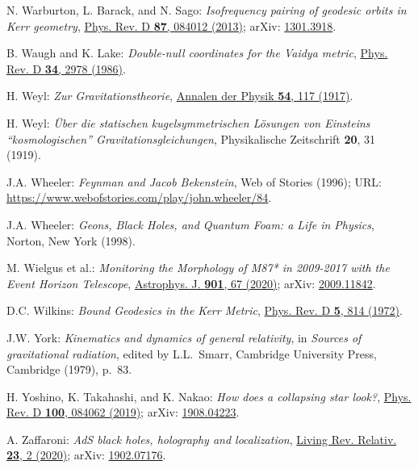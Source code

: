 \begin{thebibliography}{123}
N. Warburton, L. Barack, and N. Sago:
{\em Isofrequency pairing of geodesic orbits in Kerr geometry},
\href{https://doi.org/10.1103/PhysRevD.87.084012}{Phys. Rev. D {\bf 87}, 084012 (2013)};
arXiv: \href{https://arxiv.org/abs/1301.3918}{1301.3918}.

B. Waugh and K. Lake:
{\em Double-null coordinates for the Vaidya metric},
\href{https://doi.org/10.1103/PhysRevD.34.2978}{Phys. Rev. D {\bf 34}, 2978 (1986)}.

H. Weyl:
{\em Zur Gravitationstheorie},
\href{https://doi.org/10.1002/andp.19173591804}{Annalen der Physik {\bf 54}, 117 (1917)}.

H. Weyl:
{\em \"Uber die statischen kugelsymmetrischen L\"osungen von Einsteins ``kosmologischen'' Gravitationsgleichungen},
Physikalische Zeitschrift {\bf 20}, 31 (1919).

J.A. Wheeler:
{\em Feynman and Jacob Bekenstein},
Web of Stories (1996);
URL: \url{https://www.webofstories.com/play/john.wheeler/84}.

J.A. Wheeler:
{\em Geons, Black Holes, and Quantum Foam: a Life in Physics},
Norton, New York (1998).

M. Wielgus et al.:
{\em Monitoring the Morphology of M87* in 2009-2017 with the Event Horizon Telescope},
\href{https://doi.org/10.3847/1538-4357/abac0d}{Astrophys. J. {\bf 901}, 67 (2020)};
arXiv: \href{https://arxiv.org/abs/2009.11842}{2009.11842}.

D.C. Wilkins:
{\em Bound Geodesics in the Kerr Metric},
\href{https://doi.org/10.1103/PhysRevD.5.814}{Phys. Rev. D {\bf 5}, 814 (1972)}.

J.W. York:
{\em Kinematics and dynamics of general relativity},
in {\em Sources of gravitational radiation}, edited by L.L.~Smarr,
Cambridge University Press, Cambridge (1979), p.~83.

H. Yoshino, K. Takahashi, and K. Nakao:
{\em How does a collapsing star look?},
\href{https://doi-org.ezproxy.obspm.fr/10.1103/PhysRevD.100.084062}{Phys. Rev. D {\bf 100}, 084062 (2019)};
arXiv: \href{https://arxiv.org/abs/1908.04223}{1908.04223}.

A. Zaffaroni:
{\em AdS black holes, holography and localization},
\href{https://doi.org/10.1007/s41114-020-00027-8}{Living Rev. Relativ. {\bf 23}, 2 (2020)};
arXiv: \href{https://arxiv.org/abs/1902.07176}{1902.07176}.


\end{thebibliography}
